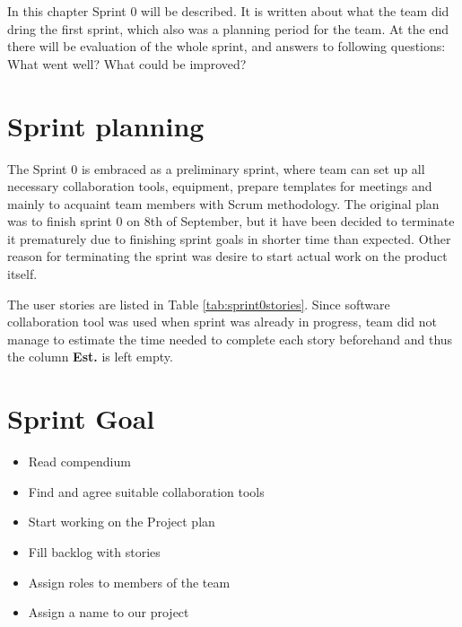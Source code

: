 In this chapter Sprint 0 will be described. It is written about what the team did dring the first sprint, which also was a planning period for the team. At the end there will be evaluation of the  whole sprint, and answers to following questions: What went well? What could be improved? 

\section{Sprint planning}
The Sprint 0 is embraced as a preliminary sprint, where team can set up all necessary collaboration tools, equipment, prepare templates for meetings and mainly to acquaint team members with Scrum methodology. The original plan was to finish sprint 0 on 8th of September, but it have been decided to terminate it prematurely due to finishing sprint goals in shorter time than expected. Other reason for terminating the sprint was desire to start actual work on the product itself.

The user stories are listed in Table \ref{tab:sprint0stories}. Since software collaboration tool was used when sprint was already in progress, team did not manage to estimate the time needed to complete each story beforehand and thus the column \textbf{Est.} is left empty.




\section{Sprint Goal}
\begin{itemize}
    \item Read compendium
    \item Find and agree suitable collaboration tools
    \item Start working on the Project plan
    \item Fill backlog with stories
    \item Assign roles to members of the team
    \item Assign a name to our project
\end{itemize}

